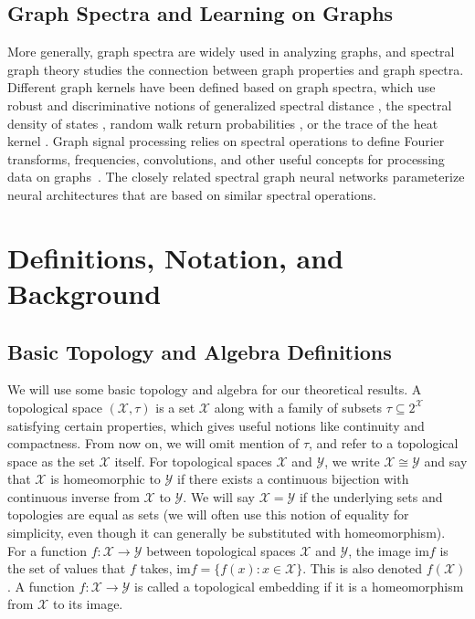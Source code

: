 \documentclass{article} \usepackage{iclr2023_conference,times}
\newcommand{\mc}[1]{\mathcal{#1}}
\newcommand{\mrm}[1]{\mathrm{#1}}
\begin{document}
\subsection{Graph Spectra and Learning on Graphs}
More generally, graph spectra are widely used in analyzing graphs, and spectral graph theory \citep{chung1997spectral} studies the connection between graph properties and graph spectra. 
Different graph kernels have been defined based on graph spectra, which use robust and discriminative notions of generalized spectral distance \citep{verma2017hunt}, the spectral density of states \citep{huang2021density}, random walk return probabilities \citep{zhang2018retgk}, or the trace of the heat kernel \citep{tsitsulin2018netlsd}. 
Graph signal processing relies on spectral operations to define Fourier transforms, frequencies, convolutions, and other useful concepts for processing data on graphs~\citep{ortega2018graph}. The closely related spectral graph neural networks  \citep{wu2020comprehensive,balcilar2020analyzing} parameterize neural architectures that are based on similar spectral operations.


\section{Definitions, Notation, and Background}

\subsection{Basic Topology and Algebra Definitions}

We will use some basic topology and algebra for our theoretical results. A topological space $(\mc X, \tau)$ is a set $\mc X$ along with a family of subsets $\tau \subseteq 2^{\mc X}$ satisfying certain properties, which gives useful notions like continuity and compactness. From now on, we will omit mention of $\tau$, and refer to a topological space as the set $\mc X$ itself. For topological spaces $\mc X$ and $\mc Y$, we write $\mc X \cong \mc Y$ and say that $\mc X$ is homeomorphic to $\mc Y$ if there exists a continuous bijection with continuous inverse from $\mc X$ to $\mc Y$. We will say $\mc X = \mc Y$ if the underlying sets and topologies are equal as sets (we will often use this notion of equality for simplicity, even though it can generally be substituted with homeomorphism). 
For a function $f : \mc X \to \mc Y$ between topological spaces $\mc X$ and $\mc Y$, the image $\mrm{im} f$ is the set of values that $f$ takes, $\mrm{im} f =\{f(x) : x \in \mc X\}$. This is also denoted $f(\mc X)$.
A function $f: \mc X \to \mc Y$ is called a topological embedding if it is a homeomorphism from $\mc X$ to its image.
\end{document}
